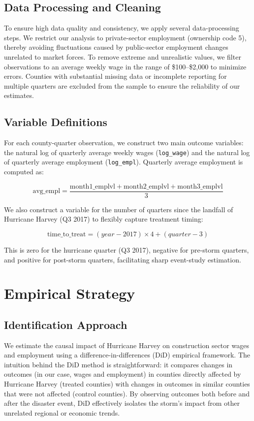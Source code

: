 \documentclass{article}
\begin{document}
\subsection{Data Processing and Cleaning}
To ensure high data quality and consistency, we apply several data-processing steps. We restrict our analysis to private-sector employment (ownership code 5), thereby avoiding fluctuations caused by public-sector employment changes unrelated to market forces.  To remove extreme and unrealistic values, we filter observations to an average weekly wage in the range of \$100–\$2,000  to minimize errors. Counties with substantial missing data or incomplete reporting for multiple quarters are excluded from the sample to ensure the reliability of our estimates.

\subsection{Variable Definitions}
For each county-quarter observation, we construct two main outcome variables: the natural log of quarterly average weekly wages (\texttt{log\_wage}) and the natural log of quarterly average employment (\texttt{log\_empl}). Quarterly average employment is computed as:

\[
\text{avg\_empl} = \frac{\text{month1\_emplvl} + \text{month2\_emplvl} + \text{month3\_emplvl}}{3}
\]

We also construct a variable for the number of quarters since the landfall of Hurricane Harvey (Q3 2017) to flexibly capture treatment timing:

\[
\text{time\_to\_treat} = (year - 2017) \times 4 + (quarter - 3)
\]

This is zero for the hurricane quarter (Q3 2017), negative for pre-storm quarters, and positive for post-storm quarters, facilitating sharp event-study estimation.

\section{Empirical Strategy}

\subsection{Identification Approach}

We estimate the causal impact of Hurricane Harvey on construction sector wages and employment using a difference-in-differences (DiD) empirical framework. The intuition behind the DiD method is straightforward: it compares changes in outcomes (in our case, wages and employment) in counties directly affected by Hurricane Harvey (treated counties) with changes in outcomes in similar counties that were not affected (control counties). By observing outcomes both before and after the disaster event, DiD effectively isolates the storm's impact from other unrelated regional or economic trends.
\end{document}
